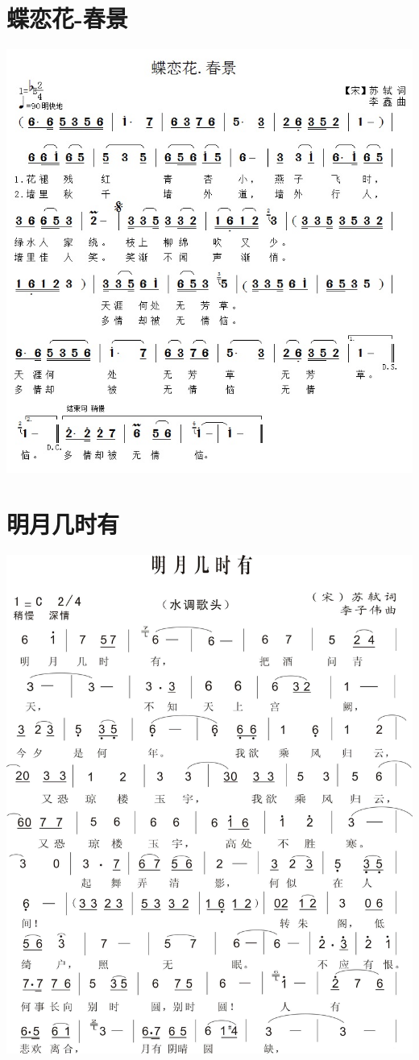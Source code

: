 \documentclass[cn,pad,chinesefont=nofont,twocol]{elegantbook}
\begin{document}
\section{蝶恋花-春景}
    \includegraphics[width=\textwidth]{dongxiao/20200411-蝶恋花-春景.jpg}
\section{明月几时有}
    \includegraphics[width=\textwidth]{dongxiao/20200411-明月几时有.jpg}
    
\end{document}
